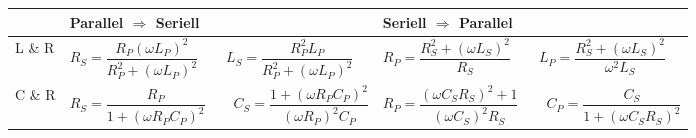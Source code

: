 	\renewcommand{\arraystretch}{1.1}
	\begin{tabular}{| p{2cm} | p{8cm} | p{8cm} |}
		\hline
			& \textbf{Parallel $\Rightarrow$ Seriell}  
			& \textbf{Seriell $\Rightarrow$ Parallel} \\
		\hline
			L \& R
			& $ R_S = \dfrac{R_P (\omega L_P)^2}{R_P^2 + (\omega L_P)^2} \qquad 
				L_S = \dfrac{R_P^2 L_P}{R_P^2 + (\omega L_P)^2}  $
			& $ R_P = \dfrac{R_S^2 + (\omega L_S)^2}{R_S} \qquad 
				L_P = \dfrac{R_S^2 + (\omega L_S)^2}{\omega^2 L_S}   $ \\
		\hline	
			C \& R
			& $ R_S = \dfrac{R_P}{1 + (\omega R_P C_P)^2} \qquad 
				C_S = \dfrac{1 + (\omega R_P C_P)^2}{(\omega R_P)^2 C_P}$
			& $ R_P = \dfrac{(\omega C_S R_S)^2 + 1}{(\omega C_S)^2 R_S} \qquad
				C_P = \dfrac{C_S}{1 + (\omega C_S R_S)^2}$\\
		\hline
	\end{tabular}


\renewcommand{\arraystretch}{\arraystretchOriginal}
